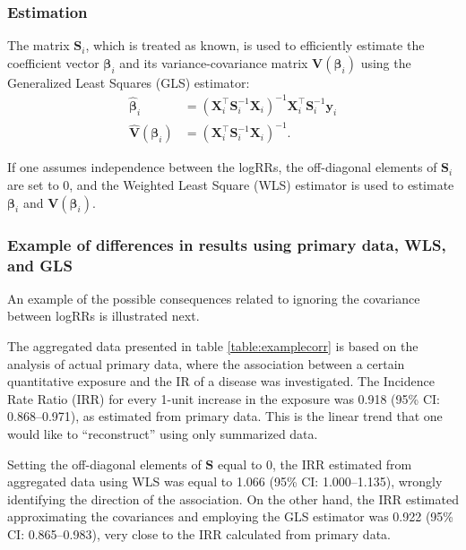 \subsubsection{Estimation}

The matrix $\mathbf{S}_i$, which is treated as known, is used to efficiently estimate the coefficient vector $\boldsymbol{\beta}_i$ and its variance-covariance matrix $\mathbf{V}(\boldsymbol{\beta}_i)$ using the Generalized Least Squares (GLS) estimator:
\begin{align*}
\hat{\boldsymbol{\beta}}_i &= \left(\mathbf{X}_i^\top \mathbf{S}_i^{-1} \mathbf{X}_i \right)^{-1} \mathbf{X}_i^\top  \mathbf{S}_i^{-1} \mathbf{y}_i \\
\hat{\mathbf{V}}(\boldsymbol{\beta}_i) &= \left(\mathbf{X}_i^\top \mathbf{S}_i^{-1} \mathbf{X}_i \right)^{-1}.
\end{align*}

If one assumes independence between the logRRs, the off-diagonal elements of $\mathbf{S}_i$ are set to 0, and the Weighted Least Square (WLS) estimator is used to estimate $\boldsymbol{\beta}_i$ and $\mathbf{V}(\boldsymbol{\beta}_i)$.

\subsubsection{Example of differences in results using primary data, WLS, and GLS}

An example of the possible consequences related to ignoring the covariance between logRRs is illustrated next.

The aggregated data presented in table \ref{table:examplecorr} is based on the analysis of actual primary data, where the association between a certain quantitative exposure and the IR of a disease was investigated. The Incidence Rate Ratio (IRR) for every 1-unit increase in the exposure was  0.918 (95\% CI: 0.868--0.971), as estimated from primary data. This is the linear trend that one would like to ``reconstruct'' using only summarized data. 

Setting the off-diagonal elements of  $\mathbf{S}$ equal to 0, the IRR estimated from aggregated data using WLS was equal to 1.066 (95\% CI: 1.000--1.135), wrongly identifying the direction of the association. On the other hand, the IRR estimated approximating the covariances and employing the GLS estimator was 0.922 (95\% CI: 0.865--0.983), very close to the IRR calculated from primary data.  

